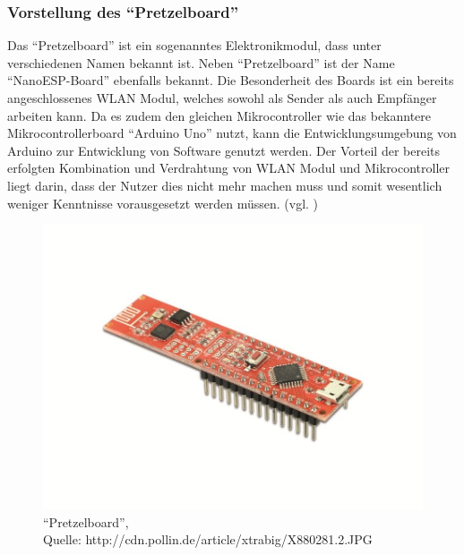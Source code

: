 \subsubsection{Vorstellung des ``Pretzelboard''}        
\label{sec:Vorstellung des ``Pretzelboard''} 
Das ``Pretzelboard'' ist ein sogenanntes Elektronikmodul, dass unter verschiedenen Namen bekannt ist. Neben ``Pretzelboard'' ist der Name ``NanoESP-Board'' ebenfalls bekannt. Die Besonderheit des Boards ist ein bereits angeschlossenes WLAN Modul, welches sowohl als Sender als auch Empfänger arbeiten kann. Da es zudem den gleichen Mikrocontroller wie das bekanntere Mikrocontrollerboard ``Arduino Uno'' nutzt, kann die Entwicklungsumgebung von Arduino zur Entwicklung von Software genutzt werden. 
Der Vorteil der bereits erfolgten Kombination und Verdrahtung von WLAN Modul und Mikrocontroller liegt darin, dass der Nutzer dies nicht mehr machen muss und somit wesentlich weniger Kenntnisse vorausgesetzt werden müssen. (vgl. \cite{.b}\cite{.kafka}\cite{FranzisVerlagGmbH.27.11.2015})

\begin{figure}[!htb]
	\centering
	\includegraphics[scale=0.4]{Pretzel.jpg}
	\caption[``Pretzelboard'']{``Pretzelboard'',\\ Quelle: http://cdn.pollin.de/article/xtrabig/X880281.2.JPG}
\end{figure}

